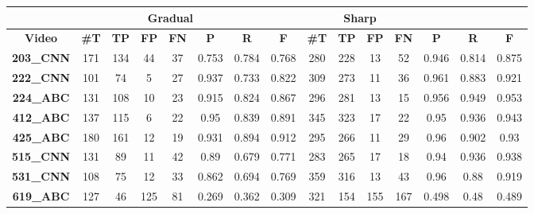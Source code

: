 \documentclass[journal]{IEEEtran}
\begin{document}
\begin{table*}[h]
\centering

\begin{tabular}{|c|c|c|c|c|c|c|c|c|c|c|c|c|c|c|}
\hline
 & \multicolumn{6}{c|}{\textbf{Gradual}} & \multicolumn{6}{c|}{\textbf{Sharp}}  \\ \hline
\textbf{Video}     & \textbf{\#T} & \textbf{TP} & \textbf{FP} & \textbf{FN} & \textbf{P} & \textbf{R} & \textbf{F} & \textbf{\#T} & \textbf{TP} & \textbf{FP} & \textbf{FN} & \textbf{P} & \textbf{R} & \textbf{F} \\ \hline
\textbf{203\_CNN} & 171           & 134         & 44          & 37          & 0.753      & 0.784      & 0.768      & 280           & 228         & 13          & 52          & 0.946      & 0.814      & 0.875      \\ \hline
\textbf{222\_CNN} & 101           & 74          & 5           & 27          & 0.937      & 0.733      & 0.822      & 309           & 273         & 11          & 36          & 0.961      & 0.883      & 0.921      \\ \hline
\textbf{224\_ABC} & 131           & 108         & 10          & 23          & 0.915      & 0.824      & 0.867      & 296           & 281         & 13          & 15          & 0.956      & 0.949      & 0.953      \\ \hline
\textbf{412\_ABC} & 137           & 115         & 6           & 22          & 0.95       & 0.839      & 0.891      & 345           & 323         & 17          & 22          & 0.95       & 0.936      & 0.943      \\ \hline
\textbf{425\_ABC} & 180           & 161         & 12          & 19          & 0.931      & 0.894      & 0.912      & 295           & 266         & 11          & 29          & 0.96       & 0.902      & 0.93       \\ \hline
\textbf{515\_CNN} & 131           & 89          & 11          & 42          & 0.89       & 0.679      & 0.771      & 283           & 265         & 17          & 18          & 0.94       & 0.936      & 0.938      \\ \hline
\textbf{531\_CNN} & 108           & 75          & 12          & 33          & 0.862      & 0.694      & 0.769      & 359           & 316         & 13          & 43          & 0.96       & 0.88       & 0.919      \\ \hline
\textbf{619\_ABC} & 127           & 46          & 125         & 81          & 0.269      & 0.362      & 0.309      & 321           & 154         & 155         & 167         & 0.498      & 0.48       & 0.489      \\ \hline

\end{tabular}
\end{table*}
\end{document}
